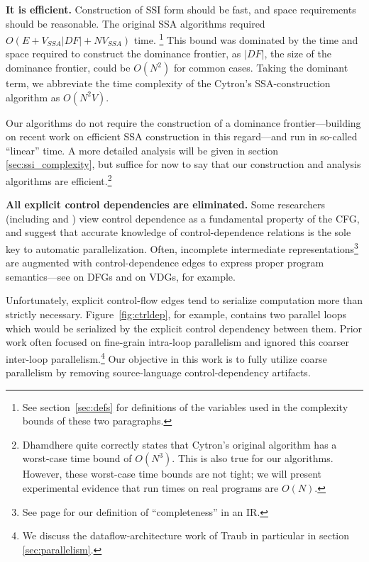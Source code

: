 \documentclass[12pt,titlepage,twoside]{article}
\begin{document}
\textbf{It is efficient.}  Construction of SSI form should be fast,
and space requirements should be reasonable.  The original SSA
algorithms required $O(E+V_{SSA}|{DF}|+NV_{SSA})$ time.%
\footnote{See section~\ref{sec:defs} for definitions of the
variables used in the complexity bounds of these two paragraphs.}
This bound
was dominated by the time and space required to construct the
dominance frontier, as $|{DF}|$, the size of the dominance frontier,
could be $O(N^2)$ for common cases.  Taking the dominant term, we
abbreviate the time complexity of the Cytron's SSA-construction
algorithm as $O(N^2 V)$.

Our algorithms do not require the construction of a dominance
frontier---building on recent work on efficient SSA construction in
this regard---and run in so-called ``linear'' time.  A more
detailed analysis will be given in section \ref{sec:ssi_complexity},
but suffice for now to say that our construction and analysis
algorithms are efficient.\footnote{Dhamdhere \cite{dhamdhere92:large} quite
correctly states that Cytron's original algorithm has a worst-case
time bound of $O(N^3)$.  This is also true for our algorithms.
However, these worst-case time bounds are not tight; we will present
experimental evidence that run times on real programs are $O(N)$.}
       

\textbf{All explicit control dependencies are eliminated.}
Some researchers (including \cite{appel:modern} and
\cite{pingali97:apt}) view control dependence as a fundamental
property of the CFG, and \cite{ballance90:pdw,appel:modern} suggest
that accurate knowledge of control-dependence relations is the sole
key to automatic parallelization.  Often, incomplete intermediate
representations\footnote{See page \pageref{sec:complete} for our
definition of ``completeness'' in an IR.} are augmented with
control-dependence edges to express proper program semantics---see
\cite{johnson93:dfg} on DFGs and \cite{weise94:vdg} on VDGs, for
example.

Unfortunately, explicit control-flow edges tend to serialize
computation more than strictly necessary.  Figure~\vref{fig:ctrldep},
for example, contains two parallel loops which would be serialized by
the explicit control dependency between them.  Prior work often
focused on fine-grain intra-loop parallelism and ignored this coarser
inter-loop parallelism.\footnote{We discuss the dataflow-architecture
work of Traub \cite{traub86:ttda} in particular in section
\ref{sec:parallelism}.} Our objective in this work is to fully utilize
coarse parallelism by removing source-language control-dependency artifacts.
\end{document}
